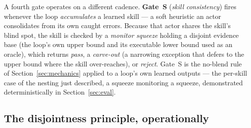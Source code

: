 \documentclass[11pt]{article}
\begin{document}
A fourth gate operates on a different cadence. \textbf{Gate~S} (\emph{skill
consistency}) fires whenever the loop \emph{accumulates} a learned skill --- a soft heuristic an
actor consolidates from its own caught errors. Because that actor shares the skill's blind spot,
the skill is checked by a \emph{monitor squeeze} holding a disjoint evidence base (the loop's own
upper bound and its executable lower bound used as an oracle), which returns \emph{pass}, a
\emph{carve-out} (a narrowing exception that defers to the upper bound where the skill
over-reaches), or \emph{reject}. Gate~S is the no-blend rule of Section~\ref{sec:mechanics}
applied to a loop's own learned outputs --- the per-skill case of the nesting just described, a
squeeze monitoring a squeeze, demonstrated deterministically in Section~\ref{sec:eval}.

\subsection{The disjointness principle, operationally}
\label{sec:disjoint}
\end{document}
